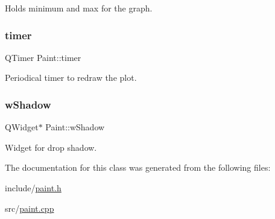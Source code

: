 Holds minimum and max for the graph. 

\mbox{\label{classPaint_a0cd2955c474cb99795506bdee2df71ab}} 
\subsubsection{\texorpdfstring{timer}{timer}}
{\footnotesize\ttfamily Q\+Timer Paint\+::timer\hspace{0.3cm}{\ttfamily [private]}}



Periodical timer to redraw the plot. 

\mbox{\label{classPaint_a6263fca255c858e9cbf7f549392b9e9e}} 
\subsubsection{\texorpdfstring{wShadow}{wShadow}}
{\footnotesize\ttfamily Q\+Widget$\ast$ Paint\+::w\+Shadow\hspace{0.3cm}{\ttfamily [private]}}



Widget for drop shadow. 



The documentation for this class was generated from the following files\+:\begin{DoxyCompactItemize}
\item 
include/\mbox{\hyperlink{paint_8h}{paint.\+h}}\item 
src/\mbox{\hyperlink{paint_8cpp}{paint.\+cpp}}\end{DoxyCompactItemize}
